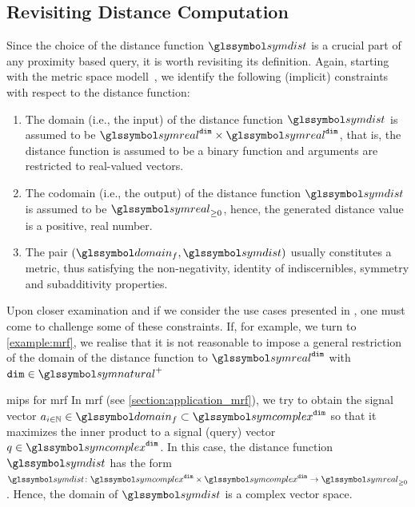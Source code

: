 \subsection{Revisiting Distance Computation}

Since the choice of the distance function $\symdist$ is a crucial part of any proximity based query, it is worth revisiting its definition. Again, starting with the metric space modell~\cite{Zezula:2006Similarity}, we identify the following (implicit) constraints with respect to the distance function:

\begin{enumerate}
    \item The domain (i.e., the input) of the distance function $\symdist$ is assumed to be $\symreal^{\mathtt{dim}} \times \symreal^{\mathtt{dim}}$, that is, the distance function is assumed to be a binary function and arguments are restricted to real-valued vectors.
    \item The codomain (i.e., the output) of the distance function $\symdist$ is assumed to be $\symreal_{\geq 0}$, hence, the generated distance value is a positive, real number.
    \item The pair $(\domain_f,\symdist)$ usually constitutes a metric, thus satisfying the non-negativity, identity of indiscernibles, symmetry and subadditivity properties.
\end{enumerate}

Upon closer examination and if we consider the use cases presented in , one must come to challenge some of these constraints. If, for example, we turn to \cref{example:mrf}, we realise that it is not reasonable to impose a general restriction of the domain of the distance function to $\symreal^{\mathtt{dim}}$ with $\mathtt{dim} \in \symnatural^{+}$

\begin{example}[label=example:mrf]{\acrlong{mips}{} for \acrshort{mrf}}{}
    In \acrshort{mrf} (see \cref{section:application_mrf}), we try to obtain the signal vector $a_{i \in \mathbb{N}} \in \domain_f \subset \symcomplex^{\mathtt{dim}}$ so that it maximizes the inner product to a signal (query) vector $q \in \symcomplex^{\mathtt{dim}}$. In this case, the distance function $\symdist$ has the form $\symdist \colon \symcomplex^{\mathtt{dim}} \times \symcomplex^{\mathtt{dim}} \to \symreal_{\geq 0}$. Hence, the domain of $\symdist$ is a complex vector space.
\end{example}

